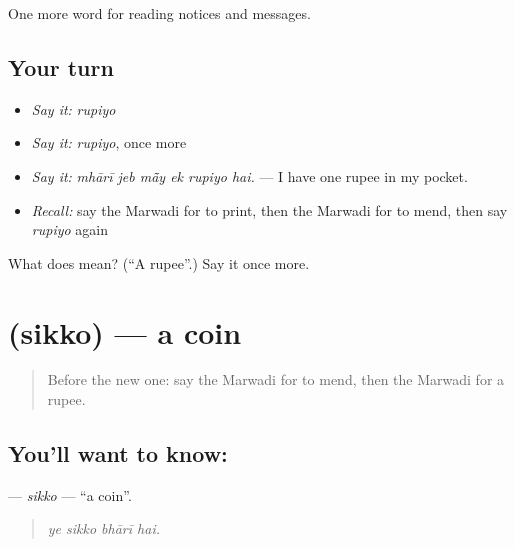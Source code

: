 \begin{grammarlens}[title={What you've built}]
One more word for reading notices and messages.
\end{grammarlens}

\subsection*{Your turn}
\begin{itemize}
\raggedright
  \item \emph{Say it:} \emph{rupiyo}
  \item \emph{Say it:} \emph{rupiyo}, once more
  \item \emph{Say it:} \emph{mhārī jeb mā̃y ek rupiyo hai.} — I have one rupee in my pocket.
  \item \emph{Recall:} say the Marwadi for to print, then the Marwadi for to mend, then say \emph{rupiyo} again
\end{itemize}

\begin{tcolorbox}[breakable,colback=teal!4,colframe=teal!35!black,title={Before you move on}]
What does  mean? (\textquotedblleft{}A rupee\textquotedblright{}.) Say it once more.
\end{tcolorbox}
\section[\texorpdfstring{\mw{सिक्को} (sikko)}{सिक्को (sikko)}]{ (sikko) — a coin}

\label{lesson:MW-C193-sikko}



\begin{quote}
Before the new one: say the Marwadi for to mend, then the Marwadi for a rupee.
\end{quote}

\subsection*{You'll want to know: }
\textbf{} — \emph{sikko} — \textquotedblleft{}a coin\textquotedblright{}.

\begin{quote}
   
\end{quote}

\begin{quote}
\emph{ye sikko bhārī hai.}
\end{quote}

